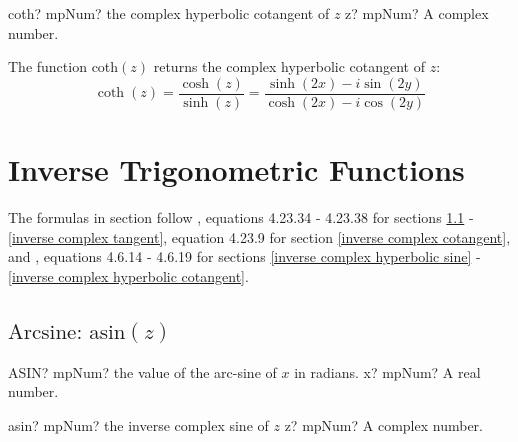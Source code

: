 \begin{mpFunctionsExtract}
	\mpFunctionOne
	{coth? mpNum? the complex hyperbolic cotangent of $z$}
	{z? mpNum? A complex number.}
\end{mpFunctionsExtract}

\vspace{0.3cm}
The function \textsf{coth$(z)$} returns the complex hyperbolic cotangent of $z$: 
\begin{equation}
	\coth(z) =\frac{\cosh(z)}{\sinh(z)} = \frac{\sinh(2x)-i \sin(2y)}{\cosh(2x)-i \cos(2y)}
\end{equation}






\newpage
\section{Inverse Trigonometric Functions}
\label{InverseTrigonometricFunctionsCplx}

The formulas in section follow \cite{NIST}, equations 4.23.34 - 4.23.38 for sections \ref{inverse complex sine} - \ref{inverse complex tangent}, equation 4.23.9 for section \ref{inverse complex cotangent}, and \cite{abramowitz_handbook_1970}, equations 4.6.14 - 4.6.19 for sections \ref{inverse complex hyperbolic sine} - \ref{inverse complex hyperbolic cotangent}.

\subsection{\texorpdfstring{$\text{Arcsine: asin}(z)$}{asin}}
\label{inverse complex sine}

\begin{mpFunctionsExtract}
	\mpWorksheetFunctionOneNotImplemented
	{ASIN? mpNum? the value of the arc-sine of $x$ in radians.}
	{x? mpNum? A real number.}
\end{mpFunctionsExtract}

\vspace{0.6cm}


\begin{mpFunctionsExtract}
	\mpFunctionOne
	{asin? mpNum? the inverse complex sine of $z$}
	{z? mpNum? A complex number.}
\end{mpFunctionsExtract}


